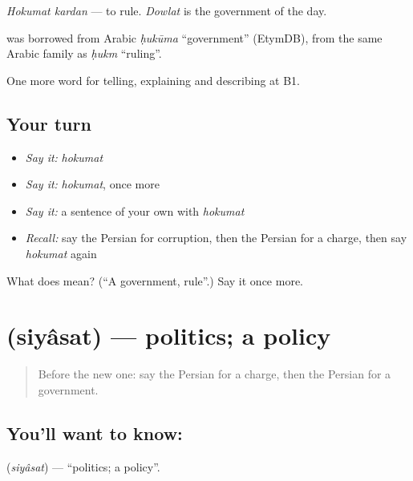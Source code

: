 \emph{Hokumat kardan} — to rule. \emph{Dowlat} is the government of the day.

\begin{cousinweb}
\textbf{} was borrowed from Arabic \emph{ḥukūma} \textquotedblleft{}government\textquotedblright{} (EtymDB), from the same Arabic family as \emph{ḥukm} \textquotedblleft{}ruling\textquotedblright{}.
\end{cousinweb}

\begin{grammarlens}[title={What you've built}]
One more word for telling, explaining and describing at B1.
\end{grammarlens}

\subsection*{Your turn}
\begin{itemize}
\raggedright
  \item \emph{Say it:} \emph{hokumat}
  \item \emph{Say it:} \emph{hokumat}, once more
  \item \emph{Say it:} a sentence of your own with \emph{hokumat}
  \item \emph{Recall:} say the Persian for corruption, then the Persian for a charge, then say \emph{hokumat} again
\end{itemize}

\begin{tcolorbox}[breakable,colback=teal!4,colframe=teal!35!black,title={Before you move on}]
What does  mean? (\textquotedblleft{}A government, rule\textquotedblright{}.) Say it once more.
\end{tcolorbox}
\section[\texorpdfstring{\fa{سیاست} (siyâsat)}{سیاست (siyâsat)}]{ (siyâsat) — politics; a policy}

\label{lesson:FA-C409-siyasat}



\begin{quote}
Before the new one: say the Persian for a charge, then the Persian for a government.
\end{quote}

\subsection*{You'll want to know: }
\textbf{} (\emph{siyâsat}) — \textquotedblleft{}politics; a policy\textquotedblright{}.

